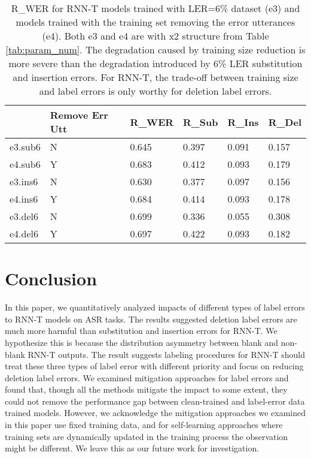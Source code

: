 \documentclass{article}
\begin{document}
\begin{table}[h]
	\caption{R\_WER for RNN-T models trained with LER=6\% dataset (e3) and models trained with the training set removing the error utterances (e4). Both e3 and e4 are with x2 structure from Table \ref{tab:param_num}. The degradation caused by training size reduction is more severe than the degradation introduced by 6\% LER substitution and insertion errors. For RNN-T, the trade-off between training size and label errors is only worthy for deletion label errors.}
	\label{tab:utt_removal}
	\centering
	\begin{tabular}{|l|p{1.2cm}|l|l|l|l|}
		\hline
		             & \textbf{Remove Err Utt} & \textbf{R\_WER} & \textbf{R\_Sub} & \textbf{R\_Ins} & \textbf{R\_Del} \\ \hline
		e3.sub6      & N & 0.645  & 0.397  & 0.091  & 0.157  \\ \hline
		e4.sub6      & Y & 0.683  & 0.412  & 0.093  & 0.179  \\ \hline
		e3.ins6      & N & 0.630  & 0.377  & 0.097  & 0.156  \\ \hline
		e4.ins6      & Y & 0.684  & 0.414  & 0.093  & 0.178  \\ \hline
		e3.del6      & N & 0.699  & 0.336  & 0.055  & 0.308  \\ \hline
		e4.del6      & Y & 0.697  & 0.422  & 0.093  & 0.182  \\ \hline
\end{tabular}
\end{table}


\section{Conclusion}
In this paper, we quantitatively analyzed impacts of different types of label errors to RNN-T models on ASR tasks. The results suggested deletion label errors are much more harmful than substitution and insertion errors for RNN-T. We hypothesize this is because the distribution asymmetry between blank and non-blank RNN-T outputs. The result suggests labeling procedures for RNN-T should treat these three types of label error with different priority and focus on reducing deletion label errors. We examined mitigation approaches for label errors and found that, though all the methods mitigate the impact to some extent, they could not remove the performance gap between clean-trained and label-error data trained models. However, we acknowledge the mitigation approaches we examined in this paper use fixed training data, and for self-learning approaches where training sets are dynamically updated in the training process the observation might be different. We leave this as our future work for investigation.
\end{document}
